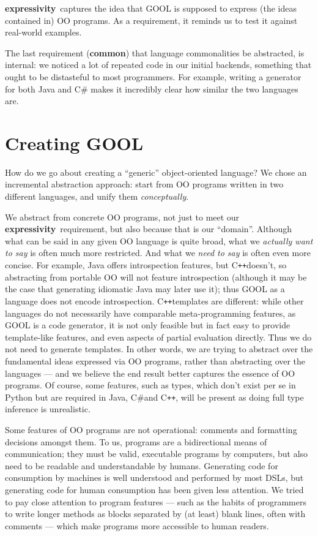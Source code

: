 \documentclass[sigplan,review,anonymous,prologue,dvipsnames]{acmart}
\newcommand{\Csharp}{C\#}
\newcommand{\Cplusplus}{C\texttt{++}}
\newcommand{\abbrev}[1]{\textbf{#1}}
\newcommand{\common}{\abbrev{common}}
\newcommand{\expressivity}{\abbrev{expressivity}}
\begin{document}
\expressivity~captures the idea that GOOL is supposed to express
(the ideas contained in) OO programs.  As a requirement, it
reminds us to test it against real-world examples.

The last requirement (\common) that language commonalities be abstracted, is
internal: we noticed a lot of repeated code in our initial
backends, something that ought to be distasteful to most programmers. For
example, writing a generator for both Java and \Csharp{} makes it incredibly
clear how similar the two languages are.

\section{Creating GOOL} \label{sec:creating}

How do we go about creating a ``generic'' object-oriented language?
We chose an incremental abstraction approach: start from OO programs written in 
two different languages, and unify them \emph{conceptually}.

We abstract from concrete OO programs, not just to meet our
\expressivity~requirement, but also because that is our ``domain''.  Although
what can be said in any given OO language is quite broad, what we
\emph{actually want to say} is often much more restricted. And what we
\emph{need to say} is often even more concise.
For example, Java offers introspection features, but \Cplusplus doesn't, so
abstracting from portable OO will not feature introspection (although it
may be the case that generating idiomatic Java may later use it);
thus GOOL as a language does not encode introspection.  \Cplusplus templates
are different: while other languages do not necessarily have comparable
meta-programming features, as GOOL is a code generator, it is not only
feasible but in fact easy to provide template-like features, and even aspects of
partial evaluation directly. Thus we do not need to generate templates.
In other words, we are trying to abstract over the fundamental ideas
expressed via OO programs, rather than abstracting over the languages ---
and we believe the end result better captures the essence of OO programs.
Of course, some features, such as types, which don't exist per se in 
Python but are required in Java, \Csharp and \Cplusplus, will be present
as doing full type inference is unrealistic.

Some features of OO programs are not operational: comments and formatting
decisions amongst them.  To us, programs are a bidirectional means of
communication; they must be valid, executable programs by computers, but
also need to be readable and understandable by humans.
Generating code for consumption by machines is well understood and performed by 
most DSLs, but generating code for human consumption has been given less 
attention. We tried to pay close attention to program features --- such
as the habits of programmers to write longer methods as blocks separated
by (at least) blank lines, often with comments --- which make programs
more accessible to human readers.
\end{document}
